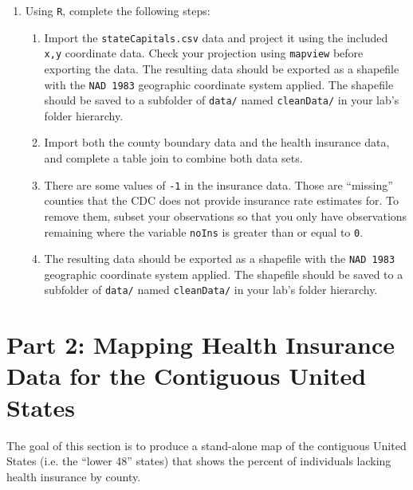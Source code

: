 \documentclass{tufte-handout}
\begin{document}
\begin{enumerate}
\item Using \texttt{R}, complete the following steps:
\begin{enumerate}
\item Import the \texttt{stateCapitals.csv} data and project it using the included \texttt{x,y} coordinate data. Check your projection using \texttt{mapview} before exporting the data. The resulting data should be exported as a shapefile with the \texttt{NAD 1983} geographic coordinate system applied. The shapefile should be saved to a subfolder of \texttt{data/} named \texttt{cleanData/} in your lab's folder hierarchy.
\item Import both the county boundary data and the health insurance data, and complete a table join to combine both data sets. 
\item There are some values of \texttt{-1} in the insurance data. Those are ``missing'' counties that the CDC does not provide insurance rate estimates for. To remove them, subset your observations so that you only have observations remaining where the variable \texttt{noIns} is greater than or equal to \texttt{0}.
\item The resulting data should be exported as a shapefile with the \texttt{NAD 1983} geographic coordinate system applied. The shapefile should be saved to a subfolder of \texttt{data/} named \texttt{cleanData/} in your lab's folder hierarchy.
\end{enumerate}
\end{enumerate}

\vspace{5mm}
\section{Part 2: Mapping Health Insurance Data for the Contiguous United States}
The goal of this section is to produce a stand-alone map of the contiguous United States (i.e. the ``lower 48'' states) that shows the percent of individuals lacking health insurance by county.
\end{document}
